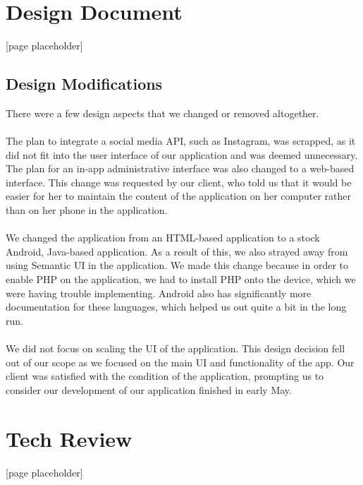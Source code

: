 \documentclass[onecolumn, draftclsnofoot,10pt, compsoc]{IEEEtran}
\begin{document}
\section{Design Document}
  [page placeholder]\newpage
  \subsection{Design Modifications}
    There were a few design aspects that we changed or removed altogether. \\ \\
    The plan to integrate a social media API, such as Instagram, was scrapped, as it did not fit into the user interface of our application and was deemed unnecessary. The plan for an in-app administrative interface was also changed to a web-based interface. This change was requested by our client, who told us that it would be easier for her to maintain the content of the application on her computer rather than on her phone in the application. \\ \\
    We changed the application from an HTML-based application to a stock Android, Java-based application. As a result of this, we also strayed away from using Semantic UI in the application. We made this change because in order to enable PHP on the application, we had to install PHP onto the device, which we were having trouble implementing. Android also has significantly more documentation for these languages, which helped us out quite a bit in the long run. \\ \\
    We did not focus on scaling the UI of the application. This design decision fell out of our scope as we focused on the main UI and functionality of the app. Our client was satisfied with the condition of the application, prompting us to consider our development of our application finished in early May.
  \newpage

\section{Tech Review}
  [page placeholder]\newpage
\end{document}
